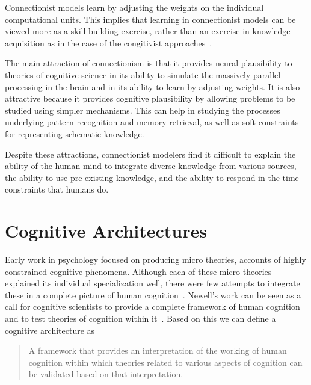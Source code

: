      Connectionist models learn by adjusting the weights on the
     individual computational units. This implies that learning in
     connectionist models can be viewed more as a skill-building
     exercise, rather than an exercise in knowledge acquisition as in
     the case of the congitivist approaches~\cite{DBLP:journals/tec/VernonMS07}.
     
     The main attraction of connectionism is that it provides neural
     plausibility\cite{103009} to theories of cognitive science in its
     ability to simulate the massively parallel processing in the
     brain and in its ability to learn by adjusting weights. It is
     also attractive because it provides cognitive plausibility by
     allowing problems to be studied using simpler mechanisms. This
     can help in studying the processes underlying pattern-recognition
     and memory retrieval, as well as soft constraints for
     representing schematic knowledge.

     Despite these attractions, connectionist modelers find it
     difficult to explain the ability of the human mind to integrate
     diverse knowledge from various sources, the ability to use
     pre-existing knowledge, and the ability to respond in the time
     constraints that humans do.

     
\section{Cognitive Architectures}
Early work in psychology focused on producing micro theories, accounts
of highly constrained cognitive phenomena. Although each of these
micro theories explained its individual specialization well, there
were few attempts to integrate these in a complete picture of human
cognition~\cite{citeulike:4408336}.  Newell's work can be seen as a
call for cognitive scientists to provide a complete framework of human
cognition and to test theories of cognition within
it~\cite{Newell:1990aa, citeulike:4408336}.
%
Based on this we can define a cognitive architecture as

\begin{quote}
A framework that provides an interpretation of the working of
human cognition within which theories related to various aspects of
cognition can be validated based on that interpretation.
\end{quote}

